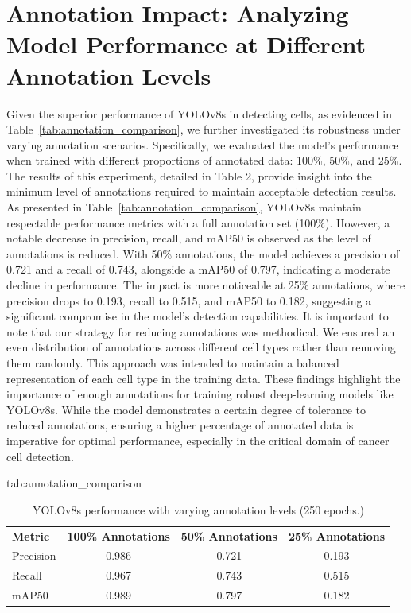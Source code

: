 \documentclass{midl} %
\begin{document}


\appendix

\section{Annotation Impact: Analyzing Model Performance at Different Annotation Levels}
\label{sec:annotation_impact}
Given the superior performance of YOLOv8s in detecting cells, as evidenced in Table~\ref{tab:annotation_comparison}, we further investigated its robustness under varying annotation scenarios. Specifically, we evaluated the model’s performance when trained with different proportions of annotated data: 100\%, 50\%, and 25\%. The results of this experiment, detailed in Table 2, provide insight into the minimum level of annotations required to maintain acceptable detection results. As presented in Table~\ref{tab:annotation_comparison}, YOLOv8s maintain respectable performance metrics with a full annotation set (100\%). However, a notable decrease in precision, recall, and mAP50 is observed as the level of annotations is reduced. With 50\% annotations, the model achieves a precision of 0.721 and a recall of 0.743, alongside a mAP50 of 0.797, indicating a moderate decline in performance. The impact is more noticeable at 25\% annotations, where precision drops to 0.193, recall to 0.515, and mAP50 to 0.182, suggesting a significant compromise in the model’s detection capabilities. It is important to note that our strategy for reducing annotations was methodical. We ensured an even distribution of annotations across different cell types rather than removing them randomly. This approach was intended to maintain a balanced representation of each cell type in the training data. These findings highlight the importance of enough annotations for training robust deep-learning models like YOLOv8s. While the model demonstrates a certain degree of tolerance to reduced annotations, ensuring a higher percentage of annotated data is imperative for optimal performance, especially in the critical domain of cancer cell detection.

\begin{table}[htbp]
\floatconts
  {tab:annotation_comparison}%
  {\caption{YOLOv8s performance with varying annotation levels (250 epochs.)}}%
  {\begin{tabular}{lccc}
  \bfseries Metric & \bfseries 100\% Annotations & \bfseries 50\% Annotations & \bfseries 25\% Annotations\\
  Precision & 0.986 & 0.721 & 0.193\\
  Recall & 0.967 & 0.743 & 0.515\\
  mAP50 & 0.989 & 0.797 & 0.182
  \end{tabular}}
\end{table}
\end{document}

